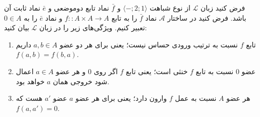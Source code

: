 فرض کنید زبان
$\mathcal{L}$
از نوع شباهت
$\langle\mathord{-};2;1\rangle$
و
$\bar f$
نماد تابع دوموضعی
و
$\bar e$
نماد ثابت آن باشد. فرض کنید در ساختار
$\mathcal{A}$
نماد
$\bar f$
را به تابع
$f\colon:A\times A\to A$
و نماد
$\bar e$
را به
$0\in A$
تعبیر کنیم.
ویژگی‌های زیر را در زبان
$\mathcal{L}$
بیان کنید:
\begin{enumerate}[label=(\alph*)]
    \item تابع $f$ نسبت به ترتیب ورودی حساس نیست؛ یعنی برای هر دو عضو
    $a,b\in A$
    داریم $f(a,b)=f(b,a)$.
    \item عضو $0$ نسبت به تابع $f$ خنثی است؛ یعنی تابع $f$ اگر روی
    $0$
    و هر عضو $a\in A$
    اعمال شود خروجی همان $a$ خواهد بود.
    \item هر عضو
    $A$ نسبت به عمل $f$ وارون دارد؛ یعنی برای هر عضو $a$ عضو $a'$ هست که $f(a,a')=0$.
\end{enumerate}

